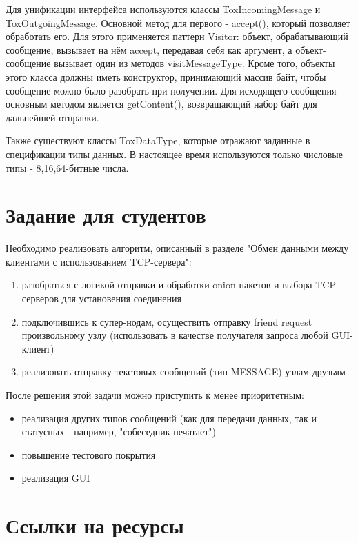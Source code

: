 \documentclass{/home/fresheed/utils/latex/university-templates/lab-report}
\begin{document}
Для унификации интерфейса используются классы ToxIncomingMessage и ToxOutgoingMessage. Основной метод для первого - accept(), который позволяет обработать его. Для этого применяется паттерн Visitor: объект, обрабатывающий сообщение, вызывает на нём accept, передавая себя как аргумент, а объект-сообщение вызывает один из методов visitMessageType. Кроме того, объекты этого класса должны иметь конструктор, принимающий массив байт, чтобы сообщение можно было разобрать при получении. Для исходящего сообщения основным методом является getContent(), возвращающий набор байт для дальнейшей отправки. 

Также существуют классы ToxDataType, которые отражают заданные в спецификации типы данных. В настоящее время используются только числовые типы - 8,16,64-битные числа.


\section{Задание для студентов}

Необходимо реализовать алгоритм, описанный в разделе "Обмен данными между клиентами с использованием TCP-сервера":
\begin{enumerate}
\item разобраться с логикой отправки и обработки onion-пакетов и выбора TCP-серверов для установения соединения
\item подключившись к супер-нодам, осуществить отправку friend request произвольному узлу (использовать в качестве получателя запроса любой GUI-клиент)
\item реализовать отправку текстовых сообщений (тип MESSAGE) узлам-друзьям
\end{enumerate}

После решения этой задачи можно приступить к менее приоритетным:
\begin{itemize}
\item реализация других типов сообщений (как для передачи данных, так и статусных - например, "собеседник печатает")
\item повышение тестового покрытия
\item реализация GUI
\end{itemize}

\section{Ссылки на ресурсы}
\end{document}
